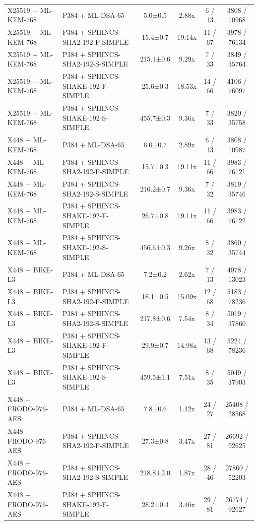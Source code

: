 \documentclass[10pt]{article}
\begin{document}
\begin{tabular}{@{}l l c c c c@{}}
X25519 + ML-KEM-768 & P384 + ML-DSA-65 & 5.0±0.5 & 2.88x & 6 / 13 & 3808 / 10968 \\
X25519 + ML-KEM-768 & P384 + SPHINCS-SHA2-192-F-SIMPLE & 15.4±0.7 & 19.14x & 11 / 67 & 3978 / 76134 \\
X25519 + ML-KEM-768 & P384 + SPHINCS-SHA2-192-S-SIMPLE & 215.1±0.6 & 9.29x & 7 / 33 & 3849 / 35764 \\
X25519 + ML-KEM-768 & P384 + SPHINCS-SHAKE-192-F-SIMPLE & 25.6±0.3 & 18.53x & 14 / 66 & 4106 / 76097 \\
X25519 + ML-KEM-768 & P384 + SPHINCS-SHAKE-192-S-SIMPLE & 455.7±0.3 & 9.36x & 7 / 33 & 3820 / 35758 \\
X448 + ML-KEM-768 & P384 + ML-DSA-65 & 6.0±0.7 & 2.89x & 6 / 13 & 3808 / 10987 \\
X448 + ML-KEM-768 & P384 + SPHINCS-SHA2-192-F-SIMPLE & 15.7±0.3 & 19.11x & 11 / 66 & 3983 / 76121 \\
X448 + ML-KEM-768 & P384 + SPHINCS-SHA2-192-S-SIMPLE & 216.2±0.7 & 9.36x & 7 / 32 & 3819 / 35746 \\
X448 + ML-KEM-768 & P384 + SPHINCS-SHAKE-192-F-SIMPLE & 26.7±0.8 & 19.11x & 11 / 66 & 3983 / 76122 \\
X448 + ML-KEM-768 & P384 + SPHINCS-SHAKE-192-S-SIMPLE & 456.6±0.3 & 9.26x & 8 / 32 & 3860 / 35744 \\
X448 + BIKE-L3 & P384 + ML-DSA-65 & 7.2±0.2 & 2.62x & 7 / 13 & 4978 / 13023 \\
X448 + BIKE-L3 & P384 + SPHINCS-SHA2-192-F-SIMPLE & 18.1±0.5 & 15.09x & 12 / 68 & 5183 / 78236 \\
X448 + BIKE-L3 & P384 + SPHINCS-SHA2-192-S-SIMPLE & 217.8±0.6 & 7.54x & 8 / 34 & 5019 / 37860 \\
X448 + BIKE-L3 & P384 + SPHINCS-SHAKE-192-F-SIMPLE & 29.9±0.7 & 14.98x & 13 / 68 & 5224 / 78236 \\
X448 + BIKE-L3 & P384 + SPHINCS-SHAKE-192-S-SIMPLE & 459.5±1.1 & 7.51x & 8 / 35 & 5049 / 37903 \\
X448 + FRODO-976-AES & P384 + ML-DSA-65 & 7.8±0.6 & 1.12x & 24 / 27 & 25408 / 28568 \\
X448 + FRODO-976-AES & P384 + SPHINCS-SHA2-192-F-SIMPLE & 27.3±0.8 & 3.47x & 27 / 81 & 26692 / 92625 \\
X448 + FRODO-976-AES & P384 + SPHINCS-SHA2-192-S-SIMPLE & 218.8±2.0 & 1.87x & 28 / 46 & 27860 / 52203 \\
X448 + FRODO-976-AES & P384 + SPHINCS-SHAKE-192-F-SIMPLE & 28.2±0.4 & 3.46x & 29 / 81 & 26774 / 92627 \\

\end{tabular}
\end{document}
